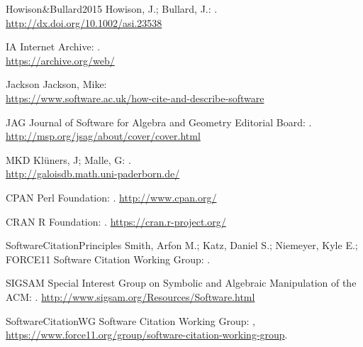\documentclass[12pt]{article}
\begin{document}
\begin{thebibliography}{19}
\bibitem
{Howison&Bullard2015}
Howison, J.; Bullard, J.:
.
\\ \url{http://dx.doi.org/10.1002/asi.23538}

\bibitem
{IA}
Internet Archive:
.\\
\newblock \url{https://archive.org/web/}


\bibitem
{Jackson}
Jackson, Mike:
\\
\newblock \url{https://www.software.ac.uk/how-cite-and-describe-software}

\bibitem
{JAG}
Journal of Software for Algebra and Geometry Editorial Board:
.\\
\newblock \url{http://msp.org/jsag/about/cover/cover.html}

\bibitem
{MKD}
Kl\"uners, J; Malle, G:
.\\
\newblock \url{http://galoisdb.math.uni-paderborn.de/}

\bibitem
{CPAN}
Perl Foundation:
.
\newblock \url{http://www.cpan.org/}


\bibitem
{CRAN}
R Foundation:
.
\newblock \url{https://cran.r-project.org/}

\bibitem
{SoftwareCitationPrinciples}
Smith, Arfon M.; Katz, Daniel S.; Niemeyer, Kyle E.; FORCE11 Software Citation
Working Group:
.\\

\bibitem
{SIGSAM}
Special Interest Group on Symbolic and Algebraic Manipulation of the ACM:
.
\newblock \url{http://www.sigsam.org/Resources/Software.html}


\bibitem
{SoftwareCitationWG}
Software Citation Working Group:
,
\newblock \url{https://www.force11.org/group/software-citation-working-group}.


\end{thebibliography}
\end{document}
